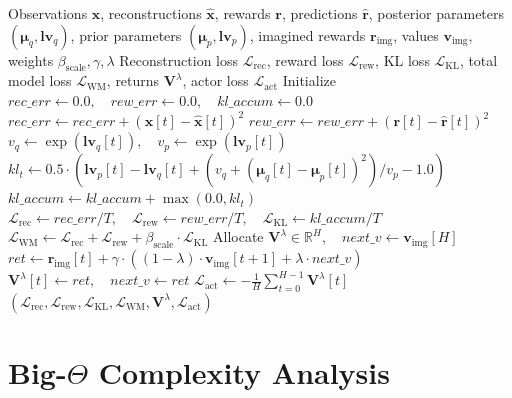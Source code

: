\documentclass[11pt,a4paper]{article}
\theoremstyle{definition}
\begin{document}
\begin{algorithm}[H]
\caption{Dreamer RSSM Loss Evaluation and Latent Return Computation}
\begin{algorithmic}[1]
\Require Observations $\mathbf{x}$, reconstructions $\hat{\mathbf{x}}$, rewards $\mathbf{r}$, predictions $\hat{\mathbf{r}}$, posterior parameters $(\boldsymbol{\mu}_q, \mathbf{lv}_q)$, prior parameters $(\boldsymbol{\mu}_p, \mathbf{lv}_p)$, imagined rewards $\mathbf{r}_{\text{img}}$, values $\mathbf{v}_{\text{img}}$, weights $\beta_{\text{scale}}, \gamma, \lambda$
\Ensure Reconstruction loss $\mathcal{L}_{\text{rec}}$, reward loss $\mathcal{L}_{\text{rew}}$, KL loss $\mathcal{L}_{\text{KL}}$, total model loss $\mathcal{L}_{\text{WM}}$, returns $\mathbf{V}^\lambda$, actor loss $\mathcal{L}_{\text{act}}$
\State Initialize $rec\_err \gets 0.0, \quad rew\_err \gets 0.0, \quad kl\_accum \gets 0.0$
    \State $rec\_err \gets rec\_err + (\mathbf{x}[t] - \hat{\mathbf{x}}[t])^2$
    \State $rew\_err \gets rew\_err + (\mathbf{r}[t] - \hat{\mathbf{r}}[t])^2$
    \State $v_q \gets \exp(\mathbf{lv}_q[t]), \quad v_p \gets \exp(\mathbf{lv}_p[t])$
    \State $kl_t \gets 0.5 \cdot (\mathbf{lv}_p[t] - \mathbf{lv}_q[t] + (v_q + (\boldsymbol{\mu}_q[t] - \boldsymbol{\mu}_p[t])^2) / v_p - 1.0)$
    \State $kl\_accum \gets kl\_accum + \max(0.0, kl_t)$
\EndFor
\State $\mathcal{L}_{\text{rec}} \gets rec\_err / T, \quad \mathcal{L}_{\text{rew}} \gets rew\_err / T, \quad \mathcal{L}_{\text{KL}} \gets kl\_accum / T$
\State $\mathcal{L}_{\text{WM}} \gets \mathcal{L}_{\text{rec}} + \mathcal{L}_{\text{rew}} + \beta_{\text{scale}} \cdot \mathcal{L}_{\text{KL}}$
\State Allocate $\mathbf{V}^\lambda \in \mathbb{R}^H, \quad next\_v \gets \mathbf{v}_{\text{img}}[H]$
    \State $ret \gets \mathbf{r}_{\text{img}}[t] + \gamma \cdot ((1 - \lambda) \cdot \mathbf{v}_{\text{img}}[t+1] + \lambda \cdot next\_v)$
    \State $\mathbf{V}^\lambda[t] \gets ret, \quad next\_v \gets ret$
\EndFor
\State $\mathcal{L}_{\text{act}} \gets - \frac{1}{H}\sum_{t=0}^{H-1} \mathbf{V}^\lambda[t]$
\State \Return $(\mathcal{L}_{\text{rec}}, \mathcal{L}_{\text{rew}}, \mathcal{L}_{\text{KL}}, \mathcal{L}_{\text{WM}}, \mathbf{V}^\lambda, \mathcal{L}_{\text{act}})$
\end{algorithmic}
\end{algorithm}

\section{Big-$\Theta$ Complexity Analysis}
\end{document}
